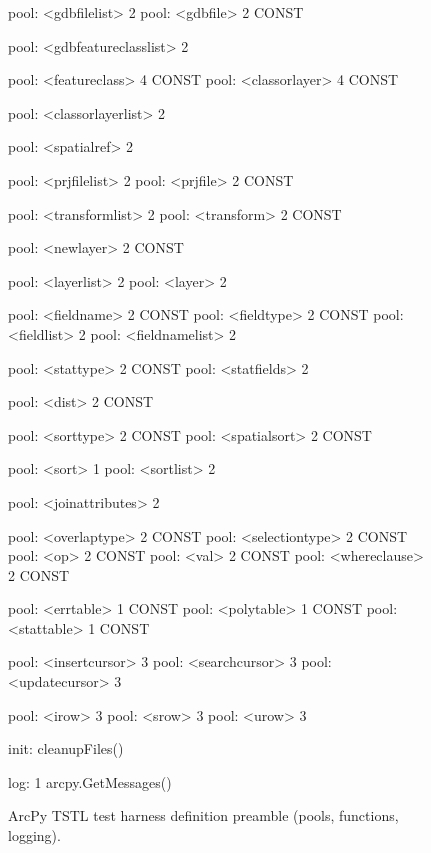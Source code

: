 \begin{figure}
{\begin{code}
pool: <gdbfilelist> 2
pool: <gdbfile> 2 CONST

pool: <gdbfeatureclasslist> 2

pool: <featureclass> 4 CONST
pool: <classorlayer> 4 CONST

pool: <classorlayerlist> 2

pool: <spatialref> 2

pool: <prjfilelist> 2
pool: <prjfile> 2 CONST

pool: <transformlist> 2
pool: <transform> 2 CONST

pool: <newlayer> 2 CONST

pool: <layerlist> 2
pool: <layer> 2

pool: <fieldname> 2 CONST
pool: <fieldtype> 2 CONST
pool: <fieldlist> 2
pool: <fieldnamelist> 2

pool: <stattype> 2 CONST
pool: <statfields> 2

pool: <dist> 2 CONST

pool: <sorttype> 2 CONST
pool: <spatialsort> 2 CONST

pool: <sort> 1
pool: <sortlist> 2

pool: <joinattributes> 2

pool: <overlaptype> 2 CONST
pool: <selectiontype> 2 CONST
pool: <op> 2 CONST
pool: <val> 2 CONST
pool: <whereclause> 2 CONST

pool: <errtable> 1 CONST
pool: <polytable> 1 CONST
pool: <stattable> 1 CONST

pool: <insertcursor> 3
pool: <searchcursor> 3
pool: <updatecursor> 3

pool: <irow> 3
pool: <srow> 3
pool: <urow> 3

init: cleanupFiles()

log: 1 arcpy.GetMessages()
\end{code}
}
\caption{ArcPy TSTL test harness definition preamble (pools, functions, logging).}
\label{preamble}
\end{figure}

